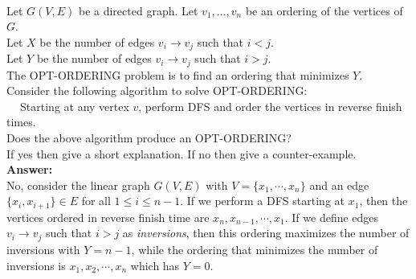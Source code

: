 \documentclass[a4paper,11pt]{article}
\begin{document}
\\
Let $G(V,E)$ be a directed graph. 
Let $v_1 , \ldots , v_n$ be an ordering of the vertices of $G$. \\
Let $X$ be the number of edges $v_i \rightarrow v_j$ such that $i < j$.\\
Let $Y$ be the number of edges $v_i \rightarrow v_j$ such that $i > j$.\\
The OPT-ORDERING problem is to find an ordering that minimizes $Y$.\\
Consider the following algorithm to solve OPT-ORDERING:\\
$~~~~$ Starting at any vertex $v$, perform DFS and order the vertices in reverse finish times.\\
Does the above algorithm produce an  OPT-ORDERING?\\
If yes then give a short explanation. 
If no then give a counter-example.\\
{\bf Answer:} \\
No, consider the linear graph $G(V, E)$ with $V = \{ x_1, \cdots, x_n \}$ and an edge $\{ x_i, x_{i + 1} \} \in E$ for all $1 \leq i \leq n - 1$. If we perform a DFS starting at $x_1$, then the vertices ordered in reverse finish time are $x_n, x_{n - 1}, \cdots, x_1$. If we define edges $v_i \rightarrow v_j$ such that $i > j$ as \textit{inversions}, then this ordering maximizes the number of inversions with $Y = n - 1$, while the ordering that minimizes the number of inversions is $x_1, x_2, \cdots, x_n$ which has $Y = 0$.
\end{document}
